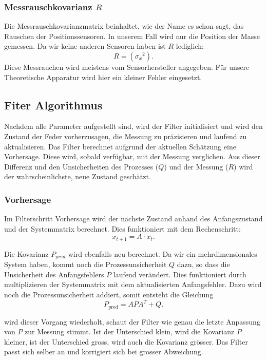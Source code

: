 \subsubsection*{Messrauschkovarianz $R$}
Die Messrauschkovarianzmatrix beinhaltet, wie der Name es schon sagt, das Rauschen der Positionssensoren. In unserem Fall wird nur die Position der Masse gemessen. Da wir keine anderen Sensoren haben ist $R$ lediglich:
\begin{equation}
R= ({\sigma_x}^2).
\end{equation} 
Diese Messrauchen wird meistens vom Sensorhersteller angegeben. Für unsere Theoretische Apparatur wird hier ein kleiner Fehler eingesetzt.

\subsection{Fiter Algorithmus}
Nachdem alle Parameter aufgestellt sind, wird der Filter initialisiert und wird den Zustand der Feder vorherzusagen, die Messung zu präzisieren und laufend zu aktualisieren. Das Filter berechnet aufgrund der aktuellen Schätzung eine Vorhersage. Diese wird, sobald verfügbar, mit der Messung verglichen. Aus dieser Differenz und den Unsicherheiten des Prozesses ($Q$) und der Messung ($R$) wird der wahrscheinlichste, neue Zustand geschätzt.


\subsubsection*{Vorhersage}
Im Filterschritt Vorhersage wird der nächste Zustand anhand des Anfangszustand und der Systemmatrix berechnet. Dies funktioniert mit dem Rechenschritt:
\begin{equation}
{x_{t+1}}=A\cdot{x_t}.
\end{equation} 


Die Kovarianz $P_{pred}$ wird ebenfalls neu berechnet. Da wir ein mehrdimensionales System haben, kommt noch die Prozessunsicherheit $Q$ dazu, so dass die Unsicherheit des Anfangsfehlers $P$ laufend verändert. Dies funktioniert durch multiplizieren der Systemmatrix mit dem aktualisierten Anfangsfehler. Dazu wird noch die Prozessunsicherheit addiert, somit entsteht die Gleichung
\[ P_\mathrm{pred} = A P A^T + Q . \]

wird dieser Vorgang wiederholt, schaut der Filter wie genau die letzte Anpassung von $P$ zur Messung stimmt. Ist der Unterschied klein, wird die Kovarianz $P$ kleiner, ist der Unterschied gross, wird auch die Kovarianz grösser. Das Filter passt sich selber an und korrigiert sich bei grosser Abweichung.

